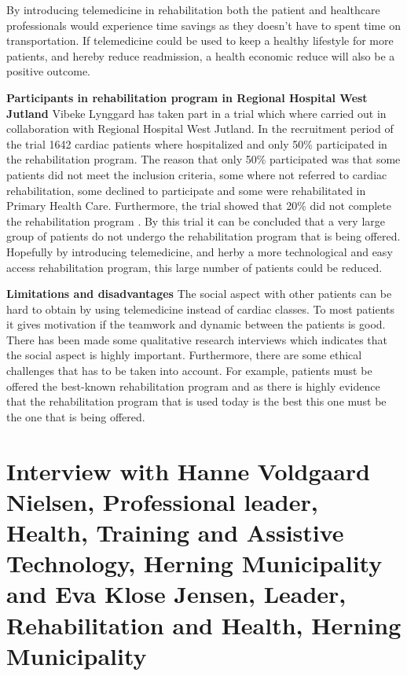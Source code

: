 By introducing telemedicine in rehabilitation both the patient and healthcare professionals would experience time savings as they doesn’t have to spent time on transportation. If telemedicine could be used to keep a healthy lifestyle for more patients, and hereby reduce readmission, a health economic reduce will also be a positive outcome.

\textbf{Participants in rehabilitation program in Regional Hospital West Jutland} \newline
Vibeke Lynggard has taken part in a trial which where carried out in collaboration with Regional Hospital West Jutland. In the recruitment period of the trial 1642 cardiac patients where hospitalized and only 50\% participated in the rehabilitation program. The reason that only 50\% participated was that some patients did not meet the inclusion criteria, some where not referred to cardiac rehabilitation, some declined to participate and some were rehabilitated in Primary Health Care. Furthermore, the trial showed that 20\% did not complete the rehabilitation program \cite{rehabiliteringDK}. By this trial it can be concluded that a very large group of patients do not undergo the rehabilitation program that is being offered. Hopefully by introducing telemedicine, and herby a more technological and easy access rehabilitation program, this large number of patients could be reduced. 

\textbf{Limitations and disadvantages} \newline
The social aspect with other patients can be hard to obtain by using telemedicine instead of cardiac classes. To most patients it gives motivation if the teamwork and dynamic between the patients is good. There has been made some qualitative research interviews which indicates that the social aspect is highly important. Furthermore, there are some ethical challenges that has to be taken into account. For example, patients must be offered the best-known rehabilitation program and as there is highly evidence that the rehabilitation program that is used today is the best this one must be the one that is being offered.  

\section{Interview with Hanne Voldgaard Nielsen, Professional leader, Health, Training and Assistive Technology, Herning Municipality and Eva Klose Jensen, Leader, Rehabilitation and Health, Herning Municipality}\label{sec: evahanne}

